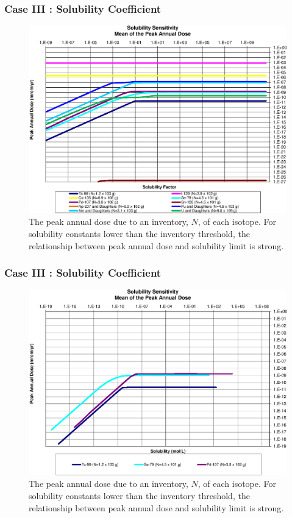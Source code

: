 \begin{frame}[c]
  \frametitle{Case III : Solubility Coefficient}


\begin{figure}[ht]
\centering
\includegraphics[width=\linewidth]{Solubility/Solubility_Summary_SolFactor.eps}
\caption{
The peak annual dose due to an inventory, $N$, of each isotope.
For solubility constants lower than the inventory threshold, the relationship between peak 
annual dose and solubility limit is strong.}
\label{fig:SolSumFactor}
\end{figure}
\end{frame}

\begin{frame}[c]
  \frametitle{Case III : Solubility Coefficient}

\begin{figure}[ht]
\centering
\includegraphics[width=\linewidth]{Solubility/Solubility_Summary_Sol.eps}
\caption{
The peak annual dose due to an inventory, $N$, of each isotope.
For solubility constants lower than the inventory threshold, the relationship between peak 
annual dose and solubility limit is strong.}
\label{fig:SolSum}
\end{figure}
\end{frame}

